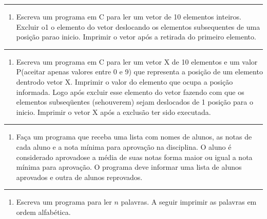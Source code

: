 \documentclass[12pt,a4paper]{article}
\providecommand{\tightlist}{%
      \setlength{\itemsep}{0pt}\setlength{\parskip}{0pt}}
\begin{document}
    \begin{center}\rule{0.5\linewidth}{0.5pt}\end{center}

\begin{enumerate}
\def\labelenumi{\arabic{enumi}.}
\setcounter{enumi}{18}
\tightlist
\item
  Escreva um programa em C para ler um vetor de 10 elementos inteiros.
  Excluir o1 o elemento do vetor deslocando os elementos subsequentes de
  uma posição parao inicio. Imprimir o vetor após a retirada do primeiro
  elemento.
\end{enumerate}

    \begin{center}\rule{0.5\linewidth}{0.5pt}\end{center}

\begin{enumerate}
\def\labelenumi{\arabic{enumi}.}
\setcounter{enumi}{19}
\tightlist
\item
  Escreva um programa em C para ler um vetor X de 10 elementos e um
  valor P(aceitar apenas valores entre 0 e 9) que representa a posição
  de um elemento dentrodo vetor X. Imprimir o valor do elemento que
  ocupa a posição informada. Logo após excluir esse elemento do vetor
  fazendo com que os elementos subseqüentes (sehouverem) sejam
  deslocados de 1 posição para o inicio. Imprimir o vetor X após a
  exclusão ter sido executada.
\end{enumerate}

    \begin{center}\rule{0.5\linewidth}{0.5pt}\end{center}

\begin{enumerate}
\def\labelenumi{\arabic{enumi}.}
\setcounter{enumi}{20}
\tightlist
\item
  Faça um programa que receba uma lista com nomes de alunos, as notas de
  cada aluno e a nota mínima para aprovação na disciplina. O aluno é
  considerado aprovadose a média de suas notas forma maior ou igual a
  nota mínima para aprovação. O programa deve informar uma lista de
  alunos aprovados e outra de alunos reprovados.
\end{enumerate}

    \begin{center}\rule{0.5\linewidth}{0.5pt}\end{center}

\begin{enumerate}
\def\labelenumi{\arabic{enumi}.}
\setcounter{enumi}{21}
\tightlist
\item
  Escreva um programa para ler \(n\) palavras. A seguir imprimir as
  palavras em ordem alfabética.
\end{enumerate}
\end{document}
